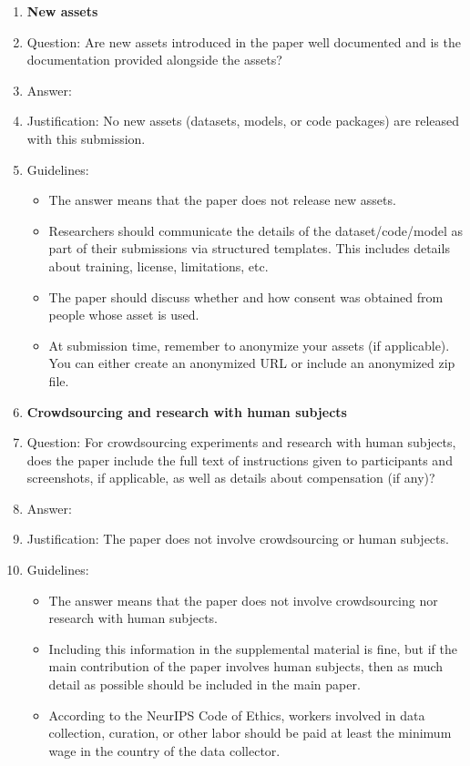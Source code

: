 \documentclass{article}
\begin{document}
\begin{enumerate}
\item {\bf New assets}
    \item[] Question: Are new assets introduced in the paper well documented and is the documentation provided alongside the assets?
    \item[] Answer: \answerNA{}
    \item[] Justification: No new assets (datasets, models, or code packages) are released with this submission.
    \item[] Guidelines:
    \begin{itemize}
        \item The answer \answerNA{} means that the paper does not release new assets.
        \item Researchers should communicate the details of the dataset\slash code\slash model as part of their submissions via structured templates. This includes details about training, license, limitations, etc.
        \item The paper should discuss whether and how consent was obtained from people whose asset is used.
        \item At submission time, remember to anonymize your assets (if applicable). You can either create an anonymized URL or include an anonymized zip file.
    \end{itemize}

\item {\bf Crowdsourcing and research with human subjects}
    \item[] Question: For crowdsourcing experiments and research with human subjects, does the paper include the full text of instructions given to participants and screenshots, if applicable, as well as details about compensation (if any)?
    \item[] Answer: \answerNA{}
    \item[] Justification: The paper does not involve crowdsourcing or human subjects.
    \item[] Guidelines:
    \begin{itemize}
        \item The answer \answerNA{} means that the paper does not involve crowdsourcing nor research with human subjects.
        \item Including this information in the supplemental material is fine, but if the main contribution of the paper involves human subjects, then as much detail as possible should be included in the main paper.
        \item According to the NeurIPS Code of Ethics, workers involved in data collection, curation, or other labor should be paid at least the minimum wage in the country of the data collector.
    \end{itemize}


\end{enumerate}
\end{document}
